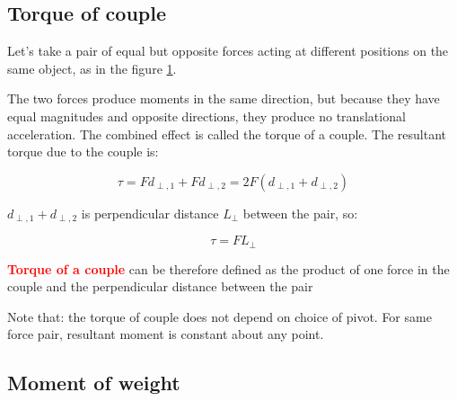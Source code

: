 \documentclass[a4paper,12pt]{book}
\newenvironment{ilight}
  {\centering
  	\vspace*{6pt}
  	\begin{tcolorbox}[colframe=Gray,colback=LightGrey!15]
  \setlength{\baselineskip}{\baselineskip}%
  }
  {\end{tcolorbox}\vspace*{-4pt}}
\newcommand{\keypoint}[1]{\textbf{\textcolor{red}{#1}}}
\renewenvironment{marginfigure}[1][]{\begin{figure}[htbp]\centering}{\end{figure}}
\newcommand{\tcbhighmath}[1]{\boxed{#1}}
\newcommand{\keypoint}[1]{\textbf{\textcolor{red}{#1}}}
\begin{document}
\subsection{Torque of couple}\label{ch:torque-of-couple}

Let's take a pair of equal but opposite forces acting at different positions on the same object, as in the figure \ref{fig:torquecouple}.

\begin{marginfigure}
	\centering
	\vspace*{-8pt}
	\vspace*{-16pt}
 \label{fig:torquecouple}
\end{marginfigure}

The two forces produce moments in the same direction, but because they have equal magnitudes and opposite directions, they produce no translational acceleration. The combined effect is called the torque of a couple. The resultant torque due to the couple is:

	$$ \tau = Fd_{\perp,1} + Fd_{\perp,2} = 2F(d_{\perp,1} + d_{\perp,2}) $$

$d_{\perp,1} + d_{\perp,2}$ is perpendicular distance $L_\perp$ between the pair, so:

$$ \tcbhighmath{\tau = F L_\perp} $$

\begin{ilight}
	\keypoint{Torque of a couple} can be therefore defined as the product of one force in the couple and the perpendicular distance between the pair
\end{ilight}
Note that: the torque of couple does not depend on choice of pivot. For same force pair, resultant moment is constant about any point.

\subsection{Moment of weight}
\end{document}
